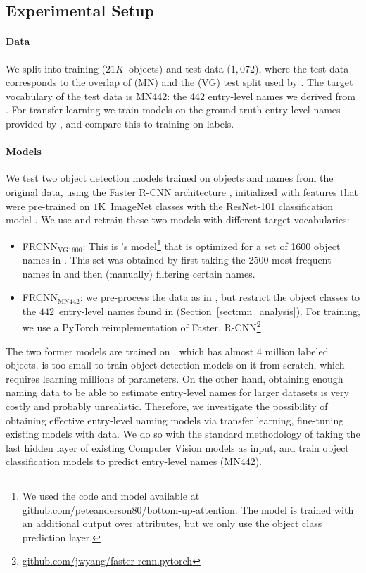\subsection{Experimental Setup}
\label{sect:exp_setup}

\paragraph{Data}
We split \mn into training ($21K$~objects) and test data ($1,072$), where the test data corresponds to the overlap of \mn (MN) and the \vg (VG) test split used by  . 
The target vocabulary of the test data is MN442: the 442 entry-level names we derived from \mn. %
For transfer learning we train models on the ground truth entry-level names provided by \mn, and compare this to training on \vg labels. 

\paragraph{Models}
We test two object detection models trained on objects and names from the original \vg data, using the Faster R-CNN architecture \cite{fasterrcnn2015}, initialized with features that were pre-trained on $1$K~ImageNet classes with the ResNet-101 classification model \cite{he2016deep}.
We use and retrain these two models with different target vocabularies:

\begin{itemize}
\item FRCNN$_{\text{VG1600}}$: This is \citep{anderson2018updown}'s model\footnote{We used the code and model available at  \url{github.com/peteanderson80/bottom-up-attention}. The model is trained with an additional output over attributes, but we only use the object class prediction layer.} that is optimized for a set of 1600 object names in \vg. This set was obtained by first taking the 2500 most frequent names in \vg and then (manually) filtering certain names.
 \item  FRCNN$_{\text{MN442}}$: we pre-process the \vg data as in \citeauthor{anderson2018updown}, but restrict the object classes to the $442$~entry-level names found in \mn (Section~\ref{sect:mn_analysis}). 
For training, we use a PyTorch reimplementation of Faster. R-CNN\footnote{\url{github.com/jwyang/faster-rcnn.pytorch}}
\end{itemize}

The two former models are trained on \vg, which has almost 4 million labeled objects.
\mn is too small to train object detection models on it from scratch, which requires learning millions of parameters.
On the other hand, obtaining enough naming data to be able to estimate entry-level names for larger datasets is very costly and probably unrealistic.
Therefore, we investigate the possibility of obtaining effective entry-level naming models via transfer learning, fine-tuning existing models with \mn data.
We do so with the standard methodology of taking the last hidden layer of existing Computer Vision models as input, and train object classification models to predict entry-level names (MN442).

